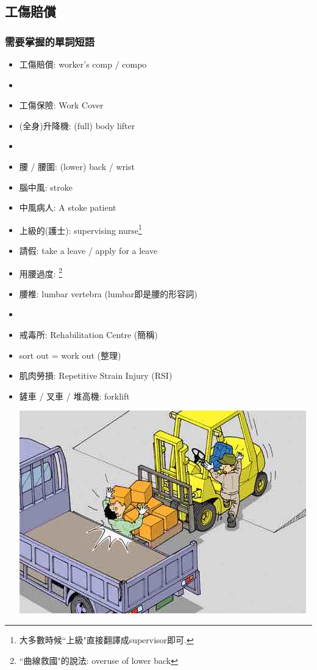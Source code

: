 \subsection{工傷賠償}
\subsubsection*{需要掌握的單詞短語}
\begin{multicols}{2}
\begin{itemize}
  \itemsep0em
  \item 工傷賠償: worker's comp / compo
  \item {}
  \item 工傷保險: Work Cover
  \item (全身)升降機: (full) body lifter
  \item {}
  \item 腰 / 腰圍: (lower) back / wrist
  \item 腦中風: stroke
  \item 中風病人: A stoke patient
  \item 上級的(護士): supervising nurse\footnote{大多數時候``上級"直接翻譯成supervisor即可.}
  \item 請假: take a leave / apply for a leave
  \item 用腰過度: \footnote{``曲線救國"的說法: overuse of lower back}
  \item 腰椎: lumbar vertebra (lumbar即是腰的形容詞)
  \item {}
  \item 戒毒所: Rehabilitation Centre (簡稱)
  \item sort out = work out (整理)
  \item 肌肉勞損: Repetitive Strain Injury (RSI)
  \item 鏟車 / 叉車 / 堆高機: forklift
  \begin{center}
      \includegraphics[scale=.3]{pics/forklift}

\end{center}
\end{itemize}
\end{multicols}
